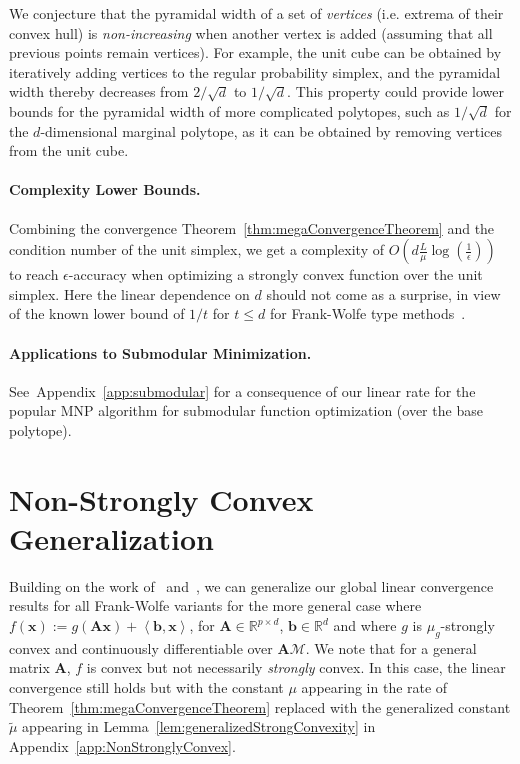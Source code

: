 \documentclass{article} %
\newcommand{\R}{\mathbb{R}}
\newcommand{\domain}{\mathcal{M}} %
\newcommand{\x}{\bm{x}}
\newcommand{\innerProd}[2]{\left\langle #1 , #2 \right\rangle}
\newcommand{\A}{\bm{A}}
\newcommand{\bv}{\bm{b}}
\newcommand{\xdim}{d}  %
\newcommand{\ydim}{p}  %
\newcommand{\0}{\mathbf{0}} %
\begin{document}
We conjecture that the pyramidal width of a set of \emph{vertices} (i.e. extrema of their convex hull) is \emph{non-increasing} when another
vertex is added (assuming that all previous points remain vertices). 
For example, the unit cube can be obtained by iteratively adding vertices to the
regular probability simplex, and the pyramidal width thereby decreases from
$2/\sqrt{d}$ to $1/\sqrt{d}$.
This property could provide lower bounds for the pyramidal width of more complicated polytopes, such 
as $1/\sqrt{d}$ for the $d$-dimensional marginal polytope, 
as it can be obtained by removing vertices from the unit cube. 
%
%
%
%
%
\vspace{-3mm}
\paragraph{Complexity Lower Bounds.}  %
Combining the convergence Theorem~\ref{thm:megaConvergenceTheorem}
and the condition number of the unit simplex, we get a complexity of $O(d
\frac{L}{\mu} \log(\frac{1}{\epsilon}))$ to reach $\epsilon$-accuracy 
when optimizing a strongly convex function over the unit simplex. Here the
linear dependence on $d$ should not come as a surprise, 
in view of the known lower bound of $1/t$ for $t \leq d$ for Frank-Wolfe type
methods~\citep{Jaggi:2013wg}.
%

\vspace{-3mm}
\paragraph{Applications to Submodular Minimization.}
See~Appendix~\ref{app:submodular} for a consequence of our linear rate for the popular MNP algorithm for submodular function optimization (over the base polytope).
%
%
%

%
%
%
%
%
%


%
%
%
%
%
%
%
%
%
%
%
%


\vspace{-4mm}
\section{Non-Strongly Convex Generalization} \label{sec:nonStronglyConvex}
\vspace{-2mm}
Building on the work of~\citet{Beck:2015vo}
and~\citet{Wang:2014:nonStronglyConvex}, we can generalize our global linear
convergence results for all Frank-Wolfe variants for the more general case
where $f(\x) := g(\A \x) + \innerProd{\bv}{\x}$, for $\A \in \R^{\ydim \times
\xdim}$, $\bv \in \R^{\xdim}$ and where $g$ is $\mu_g$-strongly convex and
continuously differentiable over $\A \domain$. We note that for a general
matrix $\A$, $f$ is convex but not necessarily \emph{strongly} convex. In
this case, the linear convergence still holds but with the constant $\mu$
appearing in the rate of Theorem~\ref{thm:megaConvergenceTheorem} replaced
with the generalized constant $\tilde{\mu}$ appearing in
Lemma~\ref{lem:generalizedStrongConvexity} in
Appendix~\ref{app:NonStronglyConvex}.
\end{document}
